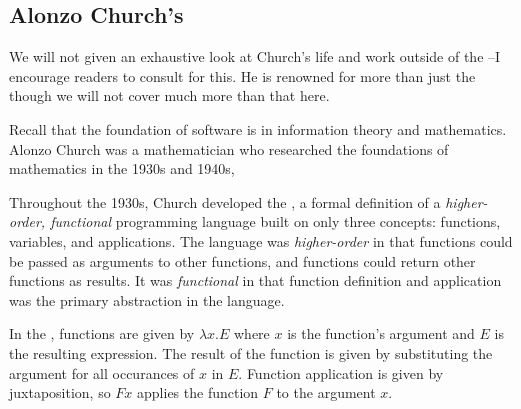 \subsection{Alonzo Church's \Lambdacalc{}}

We will not given an exhaustive look at Church's life and work outside of the
\lambdacalc{}--I encourage readers to consult 
for this.
He is renowned for more than just the \lambdacalc{} though we will not cover much more
than that here.

Recall that the foundation of software is in information theory and
mathematics.
Alonzo Church was a mathematician who researched the foundations of mathematics
in the 1930s and 1940s,

Throughout the 1930s, Church developed the \textit{\lambdacalc{}},
a formal definition of a \textit{higher-order, functional} programming language
built on only three concepts: functions, variables, and applications.
The language was \textit{higher-order} in that functions could be passed
as arguments to other functions, and functions could return other functions as results.
It was \textit{functional} in that function definition and application was the
primary abstraction in the language.

In the \lambdacalc{}, functions are given by $\lambda x. E$ where $x$ is the function's argument
and $E$ is the resulting expression. The result of the function is given by substituting the
argument for all occurances of $x$ in $E$. Function application is given by juxtaposition,
so $F x$ applies the function $F$ to the argument $x$.

